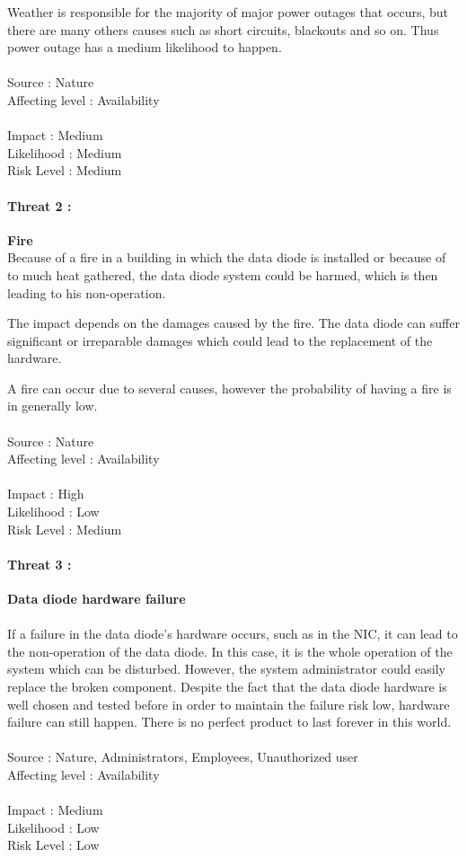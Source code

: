 \documentclass[a4paper,10pt]{article}
\begin{document}
Weather is responsible for the majority of major power outages that occurs, but there are many others causes such as short circuits, blackouts and so on. Thus power outage has a medium likelihood to happen.    \\ \\
Source : Nature \\ 
Affecting level : Availability \\ \\
Impact : Medium \\
Likelihood : Medium \\
Risk Level : Medium \\

\paragraph{Threat 2 :}  \textbf{Fire} \\
\indent Because of a fire in a building in which the data diode is installed or because of to much heat gathered, the data diode system could be harmed, which is then leading to his non-operation.

The impact depends on the damages caused by the fire. The data diode can suffer significant or irreparable damages which could lead to the replacement of the hardware.

A fire can occur due to several causes, however the probability of having a fire is in generally low.\\ \\
Source : Nature \\ 
Affecting level : Availability \\ \\
Impact : High \\
Likelihood : Low \\
Risk Level : Medium


\paragraph{Threat 3 :}  \textbf{Data diode hardware failure} 
\paragraph{}If a failure in the data diode's hardware occurs, such as in the NIC, it can lead to the non-operation of the data diode. In this case, it is the whole operation of the system which can be disturbed. However, the system administrator could easily replace the broken component.
Despite the fact that the data diode hardware is well chosen and tested before in order to maintain the failure risk low, hardware failure can still happen. There is no perfect product to last forever in this world.\\ \\
Source : Nature, Administrators, Employees, Unauthorized user \\ 
Affecting level : Availability \\ \\
Impact : Medium \\
Likelihood : Low \\
Risk Level : Low
\end{document}
